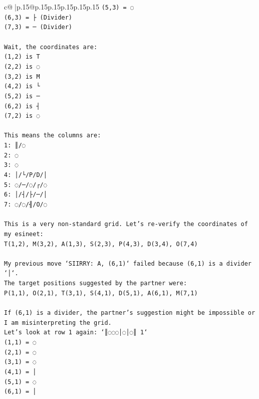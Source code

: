 \documentclass{article}
\begin{document}
{\begin{supertabular}{c@{$\;$}|p{.15\linewidth}@{}p{.15\linewidth}p{.15\linewidth}p{.15\linewidth}p{.15\linewidth}p{.15\linewidth}}
{{{\texttt{(5,3) = ◌} \\
\texttt{(6,3) = ├ (Divider)} \\
\texttt{(7,3) = ─ (Divider)} \\
\\ 
\texttt{Wait, the coordinates are:} \\
\texttt{(1,2) is T} \\
\texttt{(2,2) is ◌} \\
\texttt{(3,2) is M} \\
\texttt{(4,2) is └} \\
\texttt{(5,2) is ─} \\
\texttt{(6,2) is ┤} \\
\texttt{(7,2) is ◌} \\
\\ 
\texttt{This means the columns are:} \\
\texttt{1: ║/◌} \\
\texttt{2: ◌} \\
\texttt{3: ◌} \\
\texttt{4: │/└/P/D/│} \\
\texttt{5: ◌/─/◌/┌/◌} \\
\texttt{6: │/┤/├/─/│} \\
\texttt{7: ◌/◌/╢/O/◌} \\
\\ 
\texttt{This is a very non{-}standard grid. Let's re{-}verify the coordinates of my esineet:} \\
\texttt{T(1,2), M(3,2), A(1,3), S(2,3), P(4,3), D(3,4), O(7,4)} \\
\\ 
\texttt{My previous move `SIIRRY: A, (6,1)` failed because (6,1) is a divider `│`.} \\
\texttt{The target positions suggested by the partner were:} \\
\texttt{P(1,1), O(2,1), T(3,1), S(4,1), D(5,1), A(6,1), M(7,1)} \\
\\ 
\texttt{If (6,1) is a divider, the partner's suggestion might be impossible or I am misinterpreting the grid.} \\
\texttt{Let's look at row 1 again: `║◌◌◌│◌│◌║ 1`} \\
\texttt{(1,1) = ◌} \\
\texttt{(2,1) = ◌} \\
\texttt{(3,1) = ◌} \\
\texttt{(4,1) = │} \\
\texttt{(5,1) = ◌} \\
\texttt{(6,1) = │} \\
}}}
\end{supertabular}}
\end{document}
